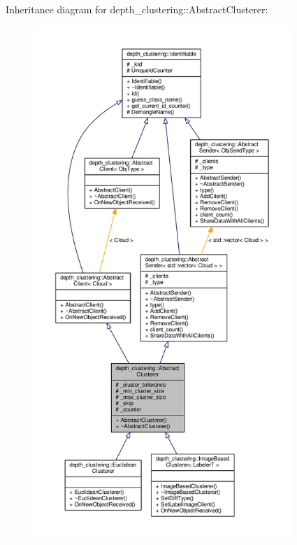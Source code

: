Inheritance diagram for depth\-\_\-clustering\-:\-:Abstract\-Clusterer\-:
\nopagebreak
\begin{figure}[H]
\begin{center}
\leavevmode
\includegraphics[height=550pt]{classdepth__clustering_1_1AbstractClusterer__inherit__graph}
\end{center}
\end{figure}


